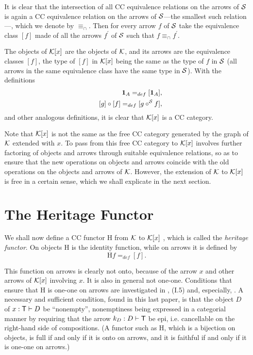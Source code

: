 It is clear that the intersection of all CC equivalence relations on the
arrows of ${\cal S}$ is again a CC equivalence relation on the arrows of $%
{\cal S}$---the smallest such relation---, which we denote by $\equiv _{\cap
}$. Then for every arrow $f$ of ${\cal S}$ take the equivalence class $[f]$
made of all the arrows $f^{\prime }$ of ${\cal S}$ such that $f\equiv _{\cap
}f^{\prime }$.

The objects of ${\cal K}[x]$ are the objects of ${\cal K}$, and its arrows
are the equivalence classes $[f]$, the type of $[f]$ in ${\cal K}[x]$ being
the same as the type of $f$ in ${\cal S}$ (all arrows in the same
equivalence class have the same type in ${\cal S}$). With the definitions 
\begin{eqnarray*}
&&{\bf 1}_{A}=_{def}[{\bf 1}_{A}], \\
&&\,[g]\circ [f]=_{def}[g\circ ^{{\cal S}}f],
\end{eqnarray*}
and other analogous definitions, it is clear that ${\cal K}[x]$ is a CC
category.

Note that ${\cal K}[x]$ is not the same as the free CC category generated by
the graph of ${\cal K}$ extended with $x$. To pass from this free CC
category to ${\cal K}[x]$ involves further factoring of objects and arrows
through suitable equivalence relations, so as to ensure that the new
operations on objects and arrows coincide with the old operations on the
objects and arrows of ${\cal K}$. However, the extension of ${\cal K}$ to $%
{\cal K}[x]$ is free in a certain sense, which we shall explicate in the
next section.

\section{The Heritage Functor}

\noindent We shall now define a CC functor H from ${\cal K}$ to ${\cal K}[x]$%
, which is called the {\it heritage functor}. On objects H is the identity
function, while on arrows it is defined by 
\[
\text{H}f=_{def}[f]. 
\]

This function on arrows is clearly not onto, because of the arrow $x$ and
other arrows of ${\cal K}[x]$ involving $x$. It is also in general not
one-one. Conditions that ensure that H is one-one on arrows are investigated
in \cite{Lam74}, \cite{LS86} (I.5) and, especially, \cite{Cub98}. A
necessary and sufficient condition, found in this last paper, is that the
object $D$ of $x:{\sf T}\vdash D$ be ``nonempty'', nonemptiness being
expressed in a categorial manner by requiring that the arrow $k_{D}:D\vdash 
{\sf T}$ be epi, i.e. cancellable on the right-hand side of compositions. (A
functor such as H, which is a bijection on objects, is full if and only if
it is onto on arrows, and it is faithful if and only if it is one-one on
arrows.)

